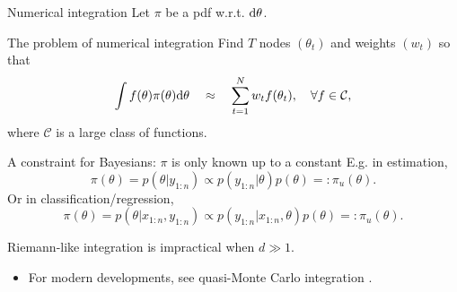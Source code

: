 \documentclass[10pt]{beamer}
\let\oldcite=\cite
\renewcommand\cite[1]{\hyperlink{#1}{\textcolor{vert}{\oldcite{#1}}}}
\begin{document}
\begin{frame}{Numerical integration}
  Let $\pi$ be a pdf w.r.t. ${\rm d} \theta$.

  \begin{block}{The problem of numerical integration}
    Find $T$ nodes
    $(\theta_t)$ and weights $(w_t)$ so that
    $$
    \int f(\theta)\pi(\theta){\rm d} \theta \quad\approx\quad \sum_{t=1}^N w_t f(\theta_t), \quad \forall
    f\in\mathcal C,
    $$
    where $\mathcal C$ is a large class of functions.
  \end{block}
  \begin{alertblock}{A constraint for Bayesians: $\pi$ is only known up to a constant}
    E.g. in estimation,
    $$ \pi(\theta) = p(\theta\vert y_{1:n}) \propto p(y_{1:n}\vert\theta) p(\theta) =: \pi_u(\theta).$$
    Or in classification/regression,
    $$
    \pi(\theta) = p(\theta\vert x_{1:n}, y_{1:n}) \propto p(y_{1:n}\vert x_{1:n}, \theta) p(\theta)=: \pi_u(\theta).
    $$
  \end{alertblock}

  \end{frame}

\begin{frame}{Riemann-like integration is impractical when $d\gg 1$.}
\blank
\begin{itemize}
\item For modern developments, see quasi-Monte Carlo integration \cite{DiPi10}.
\end{itemize}
\end{frame}
\end{document}
